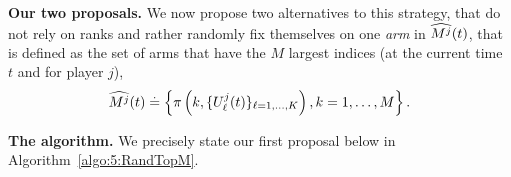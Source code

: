 \textbf{Our two proposals.}
We now propose two alternatives to this strategy, that do not rely on ranks and rather randomly fix themselves on one \emph{arm} in $\widehat{M^j}(t)$, that is defined as the set of arms that have the $M$ largest indices (at the current time $t$ and for player $j$),
\begin{equation}
  \widehat{M^j}(t) \overset{.}{=} \left\{ \pi\left(k, \{U^j_\ell(t)\}_{\ell=1,\dots,K}\right), k=1,\dots,M\right\}.
\end{equation}

\textbf{The \RandTopM{} algorithm.}
%
We precisely state our first proposal below in Algorithm~\ref{algo:5:RandTopM}.


